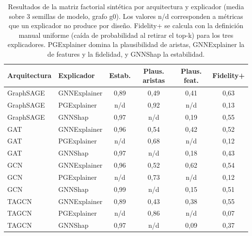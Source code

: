 \begin{table}[htbp]
\centering
\renewcommand{\arraystretch}{1.3}
\small
\begin{tabular}{ll cccc}
\toprule
\textbf{Arquitectura} & \textbf{Explicador} & \textbf{Estab.} & \textbf{Plaus. aristas} & \textbf{Plaus. feat.} & \textbf{Fidelity+} \\
\midrule
GraphSAGE & GNNExplainer & 0,89 & 0,49 & 0,41 & 0,63 \\
GraphSAGE & PGExplainer & n/d & 0,92 & n/d & 0,13 \\
GraphSAGE & GNNShap & 0,97 & n/d & 0,19 & 0,55 \\
\midrule
GAT & GNNExplainer & 0,96 & 0,54 & 0,42 & 0,52 \\
GAT & PGExplainer & n/d & 0,68 & n/d & 0,12 \\
GAT & GNNShap & 0,97 & n/d & 0,18 & 0,43 \\
\midrule
GCN & GNNExplainer & 0,96 & 0,52 & 0,62 & 0,54 \\
GCN & PGExplainer & n/d & 0,73 & n/d & 0,12 \\
GCN & GNNShap & 0,99 & n/d & 0,15 & 0,51 \\
\midrule
TAGCN & GNNExplainer & 0,89 & 0,43 & 0,38 & 0,55 \\
TAGCN & PGExplainer & n/d & 0,86 & n/d & 0,07 \\
TAGCN & GNNShap & 0,97 & n/d & 0,09 & 0,37 \\
\bottomrule
\end{tabular}
\caption{Resultados de la matriz factorial sintética por arquitectura y explicador (media sobre 3 semillas de modelo, grafo g0). Los valores n/d corresponden a métricas que un explicador no produce por diseño. Fidelity+ se calcula con la definición manual uniforme (caída de probabilidad al retirar el top-k) para los tres explicadores. PGExplainer domina la plausibilidad de aristas, GNNExplainer la de features y la fidelidad, y GNNShap la estabilidad.}
\label{tab:synth-factorial}
\end{table}
